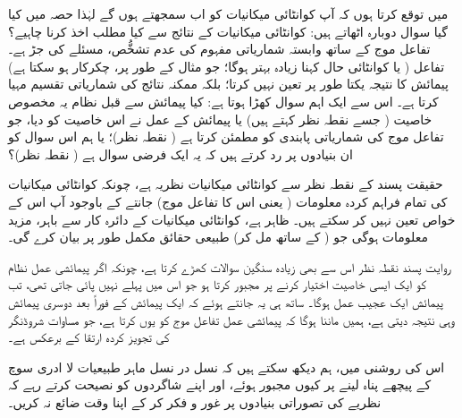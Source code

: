 
 میں توقع کرتا ہوں کہ آپ کوانٹائی میکانیات کو اب سمجھتے ہوں گے لہٰذا حصہ  میں کیا گیا سوال دوبارہ اٹھاتے ہیں: کوانٹائی میکانیات کے نتائج سے کیا مطلب اخذ کرنا چاہیے؟ تفاعل موج کے ساتھ وابستہ شماریاتی مفہوم کی عدم تشخُّص، مسئلے کی جڑ ہے۔ تفاعل ( یا کوانٹائی حال کہنا زیادہ بہتر ہوگا؛ جو مثال کے طور پر، چکرکار ہو سکتا ہے) پیمائش کا نتیجہ یکتا طور پر تعین نہیں کرتا؛ بلکہ ممکنہ نتائج کی شماریاتی تقسیم مہیا کرتا ہے۔ اس سے ایک اہم سوال کھڑا ہوتا ہے: کیا پیمائش سے قبل نظام یہ مخصوص خاصیت  ( جسے  نقطہ نظر کہتے ہیں) یا پیمائش کے عمل نے اس خاصیت کو  دیا، جو تفاعل موج کی شماریاتی پابندی کو مطمئن کرتا ہے ( نقطہ نظر)؛ یا ہم اس سوال کو ان بنیادوں پر رد کرتے ہیں کہ یہ ایک فرضی سوال ہے ( نقطہ نظر)؟

حقیقت پسند کے نقطہ نظر سے کوانٹائی میکانیات  نظریہ ہے، چونکہ کوانٹائی میکانیات کی تمام فراہم کردہ معلومات ( یعنی اس کا تفاعل موج) جانتے کے باوجود آپ اس کے خواص تعین نہیں کر سکتے ہیں۔ ظاہر ہے، کوانٹائی میکانیات کے دائرہ کار سے باہر، مزید معلومات ہوگی جو ( کے ساتھ مل کر) طبیعی حقائق مکمل طور پر بیان کرے گی۔

روایت پسند نقطہ نظر اس سے بھی زیادہ سنگین سوالات کھڑے کرتا ہے، چونکہ اگر پیمائشی عمل نظام کو ایک ایسی خاصیت اختیار کرنے پر مجبور کرتا ہو جو اس میں پہلے نہیں پائی جاتی تھی، تب پیمائش ایک عجیب عمل ہوگا۔ ساتھ ہی یہ جانتے ہوئے کہ ایک پیمائش کے فوراً بعد دوسری پیمائش وہی نتیجہ دیتی ہے، ہمیں ماننا ہوگا کہ پیمائشی عمل تفاعل موج کو یوں کرتا ہے، جو مساوات شروڈنگر کی تجویز کردہ ارتقا کے برعکس ہے۔ 

اس کی روشنی میں، ہم دیکھ سکتے ہیں کہ نسل در نسل ماہر طبیعیات لا ادری سوچ کے پیچھے پناہ لینے پر کیوں مجبور ہوئے، اور اپنے شاگردوں کو نصیحت کرتے رہے کہ نظریے کی تصوراتی بنیادوں پر غور و فکر کر کے اپنا وقت ضائع نہ کریں۔

